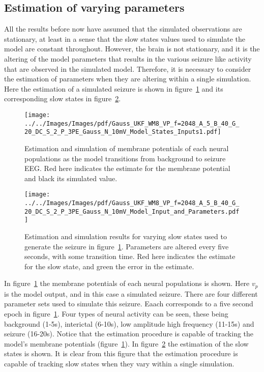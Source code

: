 \subsection{Estimation of varying parameters}

All the results before now have assumed that the simulated observations are stationary, at least in a sense that the slow states values used to simulate the model are constant throughout. However, the brain is not stationary, and it is the altering of the model parameters that results in the various seizure like activity that are observed in the simulated model. Therefore, it is necessary to consider the estimation of parameters when they are altering within a single simulation. Here the estimation of a simulated seizure is shown in figure~\ref{fig: ESTMP3VPS} and its corresponding slow states in figure~\ref{fig: ESTMP3VP}.

\begin{figure}
	\centering
		\texttt{[image: ../../Images/Images/pdf/Gauss\_UKF\_WM8\_VP\_f=2048\_A\_5\_B\_40\_G\_20\_DC\_S\_2\_P\_3PE\_Gauss\_N\_10mV\_Model\_States\_Inputs1.pdf]}
	\caption{Estimation and simulation of membrane potentials of each neural populations as the model transitions from background to seizure EEG. Red here indicates the estimate for the membrane potential and black its simulated value.}
	\label{fig: ESTMP3VPS}
\end{figure}
\begin{figure}
	\centering
		\texttt{[image: ../../Images/Images/pdf/Gauss\_UKF\_WM8\_VP\_f=2048\_A\_5\_B\_40\_G\_20\_DC\_S\_2\_P\_3PE\_Gauss\_N\_10mV\_Model\_Input\_and\_Parameters.pdf]}
	\caption{Estimation and simulation results for varying slow states used to generate the seizure in figure~\ref{fig: ESTMP3VPS}. Parameters are altered every five seconds, with some transition time. Red here indicates the estimate for the slow state, and green the error in the estimate.}
	\label{fig: ESTMP3VP}
\end{figure}


In figure~\ref{fig: ESTMP3VPS} the membrane potentials of each neural populations is shown. Here $v_{p}$ is the model output, and in this case a simulated seizure. There are four different parameter sets used to simulate this seizure. Eaach corresponds to a five second epoch in figure~\ref{fig: ESTMP3VPS}. Four types of neural activity can be seen, these being background (1-5s), interictal (6-10s), low amplitude high frequency (11-15s) and seizure (16-20s). Notice that the estimation procedure is capable of tracking the model's membrane potentials (figure~\ref{fig: ESTMP3VPS}). In figure~\ref{fig: ESTMP3VP} the estimation of the slow states is shown. It is clear from this figure that the estimation procedure is capable of tracking slow states when they vary within a single simulation.  

